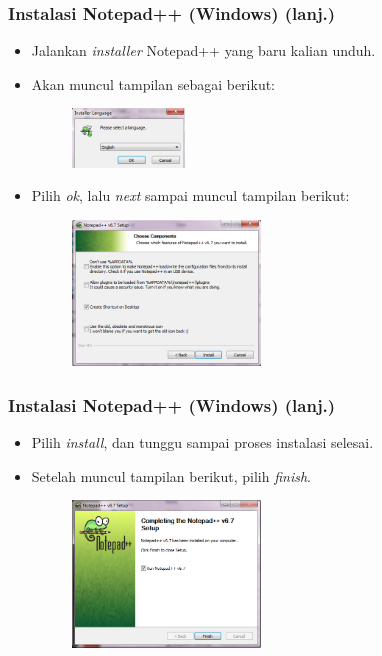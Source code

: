 \documentclass{beamer}
\begin{document}
\begin{frame}
\frametitle{Instalasi Notepad++ (Windows) (lanj.)}
\begin{itemize}
	\item Jalankan \textit{installer} Notepad++ yang baru kalian unduh.
	\item Akan muncul tampilan sebagai berikut:
	\begin{figure}
		\includegraphics[width=3cm]{asset/npp_3.PNG}
	\end{figure}
	\item Pilih \textit{ok}, lalu \textit{next} sampai muncul tampilan berikut:
	\begin{figure}
		\includegraphics[width=5cm]{asset/npp_7.PNG}
	\end{figure}
\end{itemize}
\end{frame}

\begin{frame}
\frametitle{Instalasi Notepad++ (Windows) (lanj.)}
\begin{itemize}
	\item Pilih \textit{install}, dan tunggu sampai proses instalasi selesai.
	\item Setelah muncul tampilan berikut, pilih \textit{finish}.
	\begin{figure}
		\includegraphics[width=5cm]{asset/npp_9.PNG}
	\end{figure}
\end{itemize}
\end{frame}
\end{document}
